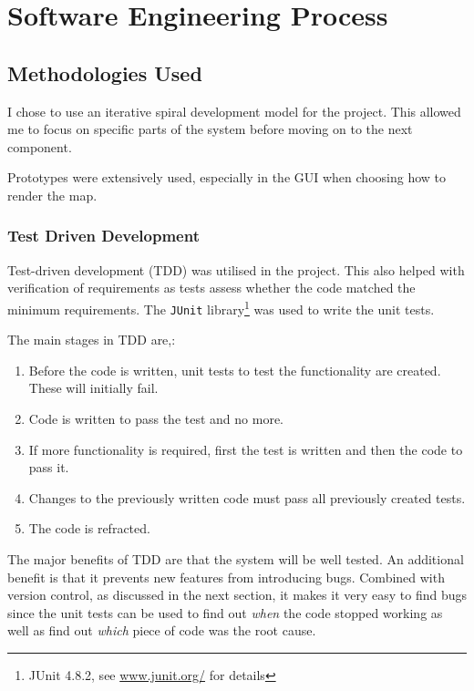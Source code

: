 \section{Software Engineering Process}

\subsection{Methodologies Used}
\label{sub:methodologies_used}

I chose to use an iterative spiral development model for the project. This allowed me to focus on specific parts of the system before moving on to the next component. 

Prototypes were extensively used, especially in the GUI when choosing how to render the map. %


\subsubsection{Test Driven Development}
Test-driven development (TDD) was utilised in the project. This also helped with verification of requirements as tests assess whether the code matched the minimum requirements. The \texttt{JUnit} library\footnote{JUnit 4.8.2, see \url{www.junit.org/} for details } was used to write the unit tests.  

The main stages in TDD are\cite{murphytest},\cite{desai2008survey}:
\begin{enumerate}[noitemsep ]
	\item Before the code is written, unit tests to test the functionality are created. These will initially fail.
   \item Code is written to pass the test and no more.
   \item If more functionality is required, first the test is written and then the code to pass it.
   \item Changes to the previously written code must pass all previously created tests.
   \item The code is refracted. 
\end{enumerate}

The major benefits of TDD are that the system will be well tested.  An additional benefit is that  it  prevents new features from introducing bugs. Combined with version control, as discussed in the next section, it makes it very easy to find bugs since the unit tests can be used to find out \emph{when} the code stopped working as well as find out \emph{which} piece of code was the root cause.

